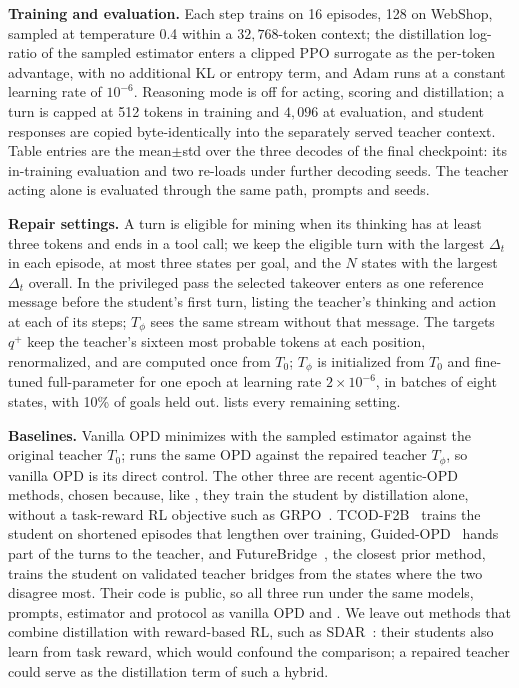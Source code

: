 \textbf{Training and evaluation.} Each step trains on 16 episodes, 128 on WebShop, sampled at temperature 0.4 within a $32{,}768$-token context; the distillation log-ratio of the sampled estimator enters a clipped PPO surrogate as the per-token advantage, with no additional KL or entropy term, and Adam runs at a constant learning rate of $10^{-6}$. Reasoning mode is off for acting, scoring and distillation; a turn is capped at 512 tokens in training and $4{,}096$ at evaluation, and student responses are copied byte-identically into the separately served teacher context. Table entries are the mean$\pm$std over the three decodes of the final checkpoint: its in-training evaluation and two re-loads under further decoding seeds. The teacher acting alone is evaluated through the same path, prompts and seeds.

\textbf{Repair settings.} A turn is eligible for mining when its thinking has at least three tokens and ends in a tool call; we keep the eligible turn with the largest $\Delta_t$ in each episode, at most three states per goal, and the $N$ states with the largest $\Delta_t$ overall. In the privileged pass the selected takeover enters as one reference message before the student's first turn, listing the teacher's thinking and action at each of its steps; $T_\phi$ sees the same stream without that message. The targets $q^{+}$ keep the teacher's sixteen most probable tokens at each position, renormalized, and are computed once from $T_0$; $T_\phi$ is initialized from $T_0$ and fine-tuned full-parameter for one epoch at learning rate $2\times10^{-6}$, in batches of eight states, with 10\% of goals held out.  lists every remaining setting.

\textbf{Baselines.}
Vanilla OPD minimizes  with the sampled estimator against the original teacher $T_0$; \method{} runs the same OPD against the repaired teacher $T_\phi$, so vanilla OPD is its direct control.
The other three are recent agentic-OPD methods, chosen because, like \method{}, they train the student by distillation alone, without a task-reward RL objective such as GRPO~\citep{grpo2024}. TCOD-F2B~\citep{tcod2026} trains the student on shortened episodes that lengthen over training, Guided-OPD~\citep{guidedopd2026} hands part of the turns to the teacher, and FutureBridge~\citep{futurebridge2026}, the closest prior method, trains the student on validated teacher bridges from the states where the two disagree most.
Their code is public, so all three run under the same models, prompts, estimator and protocol as vanilla OPD and \method{}.
We leave out methods that combine distillation with reward-based RL, such as SDAR~\citep{sdar2026}: their students also learn from task reward, which would confound the comparison; a repaired teacher could serve as the distillation term of such a hybrid.

